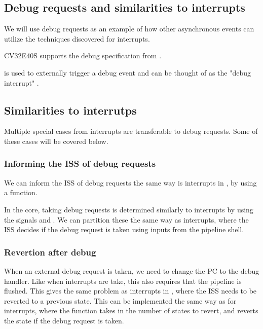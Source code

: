 \subsection{Debug requests and similarities to interrupts}

We will use debug requests as an example of how other asynchronous events can utilize the techniques discovered for interrupts.


CV32E40S supports the debug specification from \cite{pauldonahueRISCVDebugSupport2023} \cite{openhwgroupDebugTriggerCOREV2023}.

 is used to externally trigger a debug event and can be thought of as the "debug interrupt" \cite{openhwgroupDebugTriggerCOREV2023}.


\subsection{Similarities to interrutps}

Multiple special cases from interrupts are transferable to debug requests. Some of these cases will be covered below.

\subsubsection{Informing the ISS of debug requests}


We can inform the ISS of debug requests the same way is interrupts in , by using a  function.

In the core, taking debug requests is determined similarly to interrupts by using the signals  and . We can partition these the same way as interrupts, where the ISS decides if the debug request is taken using inputs from the pipeline shell.

\subsubsection{Revertion after debug}

When an external debug request is taken, we need to change the PC to the debug handler. Like when interrupts are take, this also requires that the pipeline is flushed. This gives the same problem as interrupts in , where the ISS needs to be reverted to a previous state. This can be implemented the same way as for interrupts, where the  function takes in the number of states to revert, and reverts the state if the debug request is taken. 

